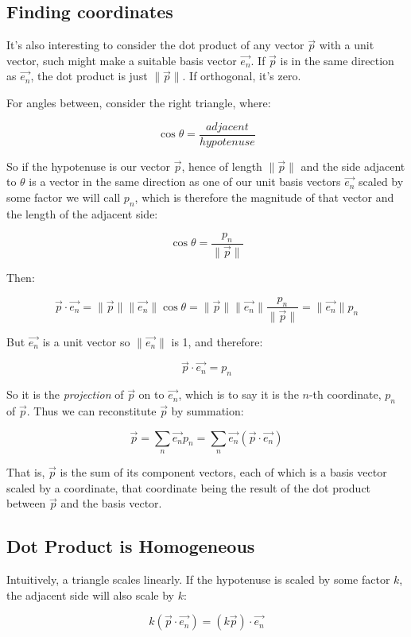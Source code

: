 \subsection{Finding coordinates}

It's also interesting to consider the dot product of any vector $\vec{p}$ with a unit vector, such might make a suitable basis vector $\vec{e_n}$. If $\vec{p}$ is in the same direction as $\vec{e_n}$, the dot product is just $\|\vec{p}\|$. If orthogonal, it's zero.

For angles between, consider the right triangle, where:

$$\cos \theta = \frac{adjacent}{hypotenuse}$$

So if the hypotenuse is our vector $\vec{p}$, hence of length $\|\vec{p}\|$ and the side adjacent to $\theta$ is a vector in the same direction as one of our unit basis vectors $\vec{e_n}$ scaled by some factor we will call $p_n$, which is therefore the magnitude of that vector and the length of the adjacent side:

$$\cos \theta = \frac{p_n}{\|\vec{p}\|}$$

Then:

$$
\vec{p}\cdot\vec{e_n}
= \|\vec{p}\| \|\vec{e_n}\|\cos{\theta}
= \|\vec{p}\| \|\vec{e_n}\|\frac{p_n}{\|\vec{p}\|}
= \|\vec{e_n}\|p_n
$$

But $\vec{e_n}$ is a unit vector so $\|\vec{e_n}\|$ is 1, and therefore:

$$
\vec{p}\cdot\vec{e_n} = p_n
$$

So it is the \textit{projection} of $\vec{p}$ on to $\vec{e_n}$, which is to say it is the $n$-th coordinate, $p_n$ of $\vec{p}$. Thus we can reconstitute $\vec{p}$ by summation:

$$
\vec{p}
= \sum_n{\vec{e_n} p_n}
= \sum_n{\vec{e_n} \left( \vec{p} \cdot \vec{e_n} \right)}
$$

That is, $\vec{p}$ is the sum of its component vectors, each of which is a basis vector scaled by a coordinate, that coordinate being the result of the dot product between $\vec{p}$ and the basis vector.

\subsection{Dot Product is Homogeneous}

Intuitively, a triangle scales linearly. If the hypotenuse is scaled by some factor $k$, the adjacent side will also scale by $k$:

$$
k(\vec{p}\cdot\vec{e_n})
= (k\vec{p})\cdot\vec{e_n}
$$

